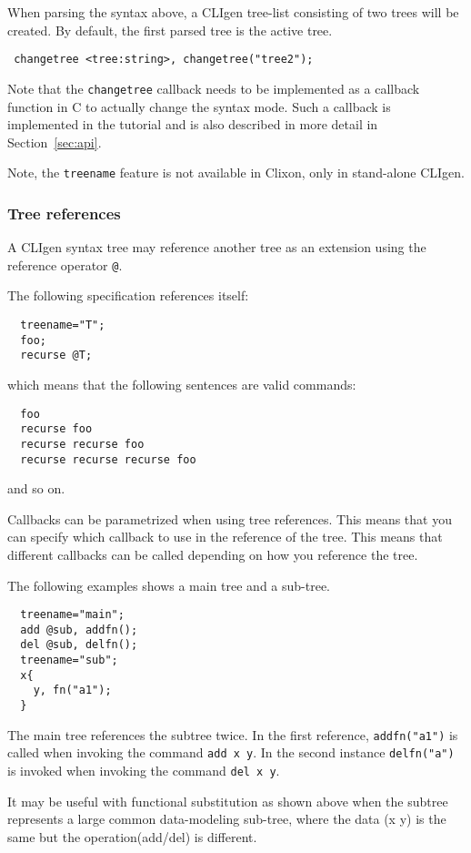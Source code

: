 \documentclass[a4paper, 10pt] {article}
\begin{document}
When parsing the syntax above, a CLIgen tree-list consisting of two
trees will be created. By default, the first parsed tree is the active tree.

\begin{verbatim}
 changetree <tree:string>, changetree("tree2");
\end{verbatim}

Note that the {\tt changetree} callback needs to be implemented as a
callback function in C to actually change the syntax mode. Such a
callback is implemented in the tutorial and is also described in more
detail in Section~\ref{sec:api}.

Note, the {\tt treename} feature is not available in Clixon, only in stand-alone CLIgen.

\subsubsection{Tree references}

A CLIgen syntax tree may reference another tree as an extension using
the reference operator {\tt @}.

The following specification references itself:
\begin{verbatim}
  treename="T";
  foo;
  recurse @T;
\end{verbatim}
which means that the following sentences are valid commands:
\begin{verbatim}
  foo
  recurse foo
  recurse recurse foo
  recurse recurse recurse foo
\end{verbatim}
and so on.

Callbacks can be parametrized when using tree references. This means
that you can specify which callback to use in the reference of the
tree. This means that different callbacks can be called depending on
how you reference the tree.

The following examples shows a main tree and a sub-tree. 

\begin{verbatim}
  treename="main";
  add @sub, addfn();
  del @sub, delfn();
  treename="sub";
  x{
    y, fn("a1");
  }
\end{verbatim}

The main tree references the subtree twice. In the first reference,
{\tt addfn("a1")} is called when invoking the command {\tt add x y}. In the
second instance {\tt delfn("a")} is invoked when invoking the command {\tt del x y}.

It may be useful with functional substitution as shown above when the
subtree represents a large common data-modeling sub-tree, where the
data (x y) is the same but the operation(add/del) is different.
\end{document}
